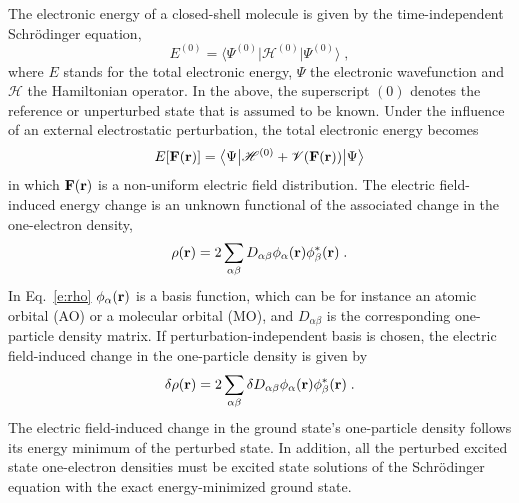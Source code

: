 \documentclass[aip,jcp,preprint,amsmath,amssymb,floatfix]{revtex4-1}
\newcommand{\tbraket}[3]{\ensuremath{\bigl\langle {#1} \bigl\lvert {#2} \bigl\lvert {#3} \bigr\rangle}}
\begin{document}
The electronic energy of a closed\hyp{}shell molecule is given by the time\hyp{}independent Schr{\"o}dinger equation,
%
\begin{equation}
 E^{(0)} = \tbraket{\Psi^{(0)}}{\mathscr{H}^{(0)}}{\Psi^{(0)}} \;,
\end{equation}
%
where $E$ stands for the total electronic energy, $\Psi$ the electronic wavefunction and $\mathscr{H}$
the Hamiltonian operator. In the above, the superscript $(0)$
denotes the reference or unperturbed state that is assumed to be known.
Under the influence of an external electrostatic perturbation, the total electronic energy
becomes
%
\begin{equation}
 E[{\bf F}({\bf r})] = \tbraket{\Psi}{\mathscr{H}^{(0)} + \mathscr{V}({\bf F}({\bf r}))}{\Psi}
\end{equation}
%
in which ${\bf F}({\bf r})$ is a non\hyp{}uniform electric field distribution.
The electric field\hyp{}induced energy change is an unknown functional 
of the associated change in the one\hyp{}electron density,
%
\begin{equation}\label{e:rho}
 \rho({\bf r}) = 2\sum_{\alpha\beta} D_{\alpha\beta} \phi_\alpha({\bf r}) \phi^*_\beta({\bf r}) \;.
\end{equation}
%
In Eq.~\eqref{e:rho} $\phi_\alpha({\bf r})$ is a basis function, which can be for instance 
an atomic orbital (AO) or a molecular orbital (MO), and $D_{\alpha\beta}$ is the corresponding
one\hyp{}particle density matrix.
If perturbation\hyp{}independent basis is chosen, the electric field\hyp{}induced change in the one\hyp{}particle density
is given by
%
\begin{equation}\label{e:rho-1}
 \delta \rho({\bf r}) = 2\sum_{\alpha\beta} \delta D_{\alpha\beta} \phi_\alpha({\bf r}) \phi^*_\beta({\bf r}) \;.
\end{equation}
%
The electric field\hyp{}induced change in the ground state's one\hyp{}particle density 
follows its energy minimum of the perturbed state. In addition, all the perturbed 
excited state one\hyp{}electron densities must be excited state solutions of the Schr{\"o}dinger equation
with the exact energy\hyp{}minimized ground state. 
\end{document}
